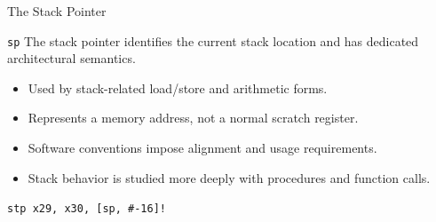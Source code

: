 \documentclass[aspectratio=169,11pt,t]{beamer}
\newcommand{\code}[1]{\texttt{#1}}
\begin{document}

\begin{frame}{The Stack Pointer}

\begin{block}{\code{sp}}
The stack pointer identifies
the current stack location
and has dedicated architectural semantics.
\end{block}

\vspace{0.15cm}

\begin{itemize}
  \item Used by stack-related
        load/store and arithmetic forms.
  \item Represents a memory address,
        not a normal scratch register.
  \item Software conventions impose
        alignment and usage requirements.
  \item Stack behavior is studied
        more deeply with procedures
        and function calls.
\end{itemize}

\vspace{0.15cm}

\begin{center}
\code{stp x29, x30, [sp, \#-16]!}
\end{center}

\end{frame}



\end{document}
